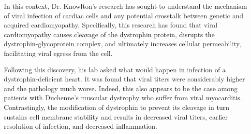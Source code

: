 \documentclass[11pt,letterpaper,final] {article}
\begin{document}
In this context, Dr. Knowlton's research has sought to understand the mechanism of viral infection of cardiac cells and any potential crosstalk between genetic and acquired cardiomyopathy. Specifically, this research has found that viral cardiomyopathy causes cleavage of the dystrophin protein, disrupts the dystrophin-glycoprotein complex, and ultimately increases cellular permeability, facilitating viral egress from the cell.

Following this discovery, his lab asked what would happen in infection of a dystrophin-deficient heart. It was found that viral titers were considerably higher and the pathology much worse. Indeed, this also appears to be the case among patients with Duchenne's muscular dystrophy who suffer from viral myocarditis. Contrastingly, the modification of dystrophin to prevent its cleavage in turn sustains cell membrane stability and results in decreased viral titers, earlier resolution of infection, and decreased inflammation.
\end{document}
